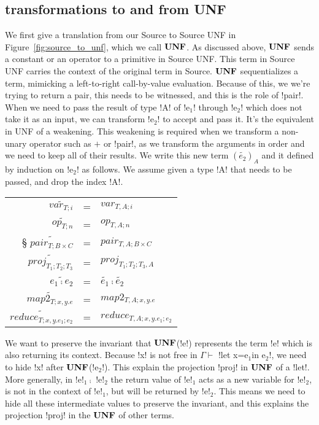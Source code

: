 

\subsection{transformations to and from UNF} %
\label{sub:transformations to and from UNF}

We first give a translation from our Source to Source UNF in Figure~\ref{fig:source_to_unf}, which we call $\mathbf{UNF}$.
As discussed above, $\mathbf{UNF}$ sends a constant or an operator to a primitive in Source UNF. 
This term in Source UNF carries the context of the original term in Source.
$\mathbf{UNF}$ sequentializes a term, mimicking a left-to-right call-by-value evaluation.
Because of this, we we're trying to return a pair, this needs to be witnessed, and this is the role of !pair!.
When we need to pass the result of type !A! of !e$_{1}$! through !e$_{2}$! which does not take it as an input, we can transform !e$_{2}$! to accept and pass it.
It's the equivalent in UNF of a weakening.
This weakening is required when we transform a non-unary operator such as $+$ or !pair!, as we transform the arguments in order and we need to keep all of their results.
We write this new term $(\widetilde{e_{2}})_{A}$ and it defined by induction on !e$_{2}$! as follows. 
We assume given a type !A! that needs to be passed, and drop the index !A!.

\begin{tabular}{r c l}
    $\widetilde{var_{T;i}}$  &=& $var_{T,A;i}$ \\
    $\widetilde{op_{T;n}}$  &=& $op_{T,A;n}$ \\§
    $\widetilde{pair_{T;B\times C}}$  &=& $pair_{T,A;B\times C}$ \\
    $\widetilde{proj_{T_1;T_2;T_3}}$  &=& $proj_{T_1;T_2;T_3,A}$ \\
    $\widetilde{e_1 \comp e_2}$  &=& $\widetilde{e_1}\comp\widetilde{e_2}$ \\
    $\widetilde{map2_{T;x,y.e}}$  &=& $map2_{T,A;x,y.e}$ \\
    $\widetilde{reduce_{T;x,y.e_1;e_2}}$ &=& $reduce_{T,A;x,y.e_1;e_2}$ \\
\end{tabular}

We want to preserve the invariant that $\mathbf{UNF}$(!e!) represents the term !e! which is also returning its context. 
Because !x! is not free in $\Gamma \vdash$ !let x=e$_1$in e$_2$!, we need to hide !x! after $\mathbf{UNF}$(!e$_2$!).
This explain the projection !proj! in $\mathbf{UNF}$ of a !let!. 
More generally, in !e!$_{1} \comp$ !e!$_{2}$ the return value of !e!$_{1}$ acts as a new variable for !e!$_{2}$, 
is not in the context of !e!$_{1}$, but will be returned by !e!$_{2}$.
This means we need to hide all these intermediate values to preserve the invariant,
and this explains the projection !proj! in the $\mathbf{UNF}$ of other terms. 

